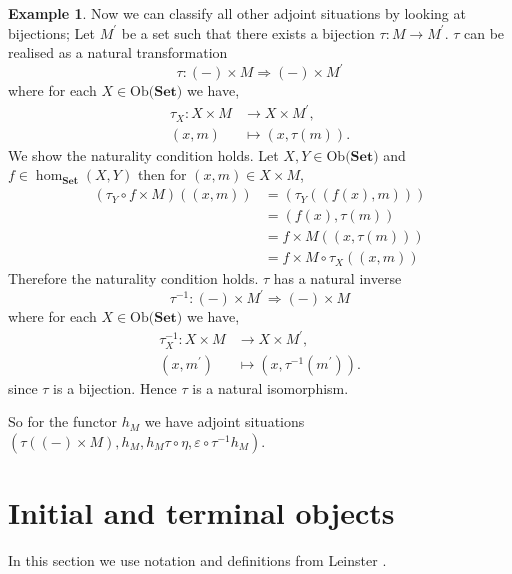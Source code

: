 \documentclass[11pt,a4paper]{article}
\theoremstyle{definition}
\newtheorem{example}[thm]{Example}
\newcommand\ho[3][]{\hom_{#1}(#2,#3)}
\newcommand\ob[1]{\mathrm{Ob(}#1\mathrm{)}}
\newcommand\nattran[3]{#1\colon#2\Rightarrow#3}
\numberwithin{equation}{section}
\begin{document}
\begin{example}
Now we can classify all other adjoint situations by looking at bijections;
Let $M^\prime$ be a set such that there exists a bijection $\tau\colon M\to M^\prime$. $\tau$ can be realised as a natural transformation 
\[\nattran{\tau}{(-)\times M}{(-)\times M^\prime}\] 
where for each $X\in\ob{\mathbf{Set}}$ we have,
\begin{align*}
\tau_{X}\colon X\times M&\to X\times M^\prime,\\
(x,m)&\mapsto (x,\tau(m)).
\end{align*}
We show the naturality condition holds. Let $X,Y\in\ob{\mathbf{Set}}$ and $f\in\ho[\mathbf{Set}]{X}{Y}$ then for $(x,m)\in X\times M$,
\begin{align*}
    (\tau_{Y}\circ f\times M )((x,m))&= (\tau_Y((f(x),m))) \\
    &= (f(x),\tau(m))\\
    &= f\times M((x,\tau(m))) \\
    &= f\times M \circ \tau_{X}((x,m))
\end{align*}
Therefore the naturality condition holds.
$\tau$ has a natural inverse
\[\nattran{\tau^{-1}}{(-)\times M^{\prime}}{(-)\times M}\]
where for each $X\in\ob{\mathbf{Set}}$ we have,
\begin{align*}
\tau_{X}^{-1}\colon X\times M&\to X\times M^\prime,\\
(x,m^\prime)&\mapsto (x,\tau^{-1}(m^\prime)).
\end{align*}
since $\tau$ is a bijection. Hence $\tau$ is a natural isomorphism. 

So for the functor $h_{M}$ we have adjoint situations $(\tau((-)\times M),h_{M},h_{M}\tau \circ \eta,\varepsilon\circ\tau^{-1}h_{M})$.
\end{example}
\pagebreak
\section{Initial and terminal objects}
\label{s:intermob} 
In this section we use notation and definitions from Leinster \cite{Leinster}.
\end{document}

